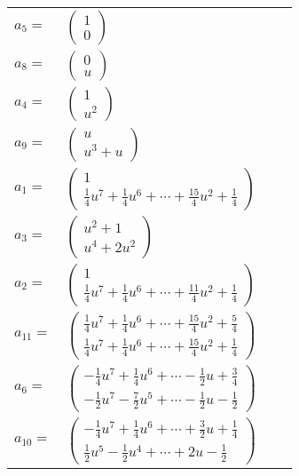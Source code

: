 \documentclass[1p]{elsarticle_modified}
\theoremstyle{definition}
\begin{document}
\begin{tabular}{m{7pt} m{180pt} m{7pt} m{180pt} }
\flushright $a_{5}=$&$\begin{pmatrix}1\\0\end{pmatrix}$ \\
\flushright $a_{8}=$&$\begin{pmatrix}0\\u\end{pmatrix}$ \\
\flushright $a_{4}=$&$\begin{pmatrix}1\\u^2\end{pmatrix}$ \\
\flushright $a_{9}=$&$\begin{pmatrix}u\\u^3+u\end{pmatrix}$ \\
\flushright $a_{1}=$&$\begin{pmatrix}1\\\frac{1}{4} u^7+\frac{1}{4} u^6+\cdots+\frac{15}{4} u^2+\frac{1}{4}\end{pmatrix}$ \\
\flushright $a_{3}=$&$\begin{pmatrix}u^2+1\\u^4+2 u^2\end{pmatrix}$ \\
\flushright $a_{2}=$&$\begin{pmatrix}1\\\frac{1}{4} u^7+\frac{1}{4} u^6+\cdots+\frac{11}{4} u^2+\frac{1}{4}\end{pmatrix}$ \\
\flushright $a_{11}=$&$\begin{pmatrix}\frac{1}{4} u^7+\frac{1}{4} u^6+\cdots+\frac{15}{4} u^2+\frac{5}{4}\\\frac{1}{4} u^7+\frac{1}{4} u^6+\cdots+\frac{15}{4} u^2+\frac{1}{4}\end{pmatrix}$ \\
\flushright $a_{6}=$&$\begin{pmatrix}-\frac{1}{4} u^7+\frac{1}{4} u^6+\cdots-\frac{1}{2} u+\frac{3}{4}\\-\frac{1}{2} u^7-\frac{7}{2} u^5+\cdots-\frac{1}{2} u-\frac{1}{2}\end{pmatrix}$ \\
\flushright $a_{10}=$&$\begin{pmatrix}-\frac{1}{4} u^7+\frac{1}{4} u^6+\cdots+\frac{3}{2} u+\frac{1}{4}\\\frac{1}{2} u^5-\frac{1}{2} u^4+\cdots+2 u-\frac{1}{2}\end{pmatrix}$ \\

\end{tabular}
\end{document}
